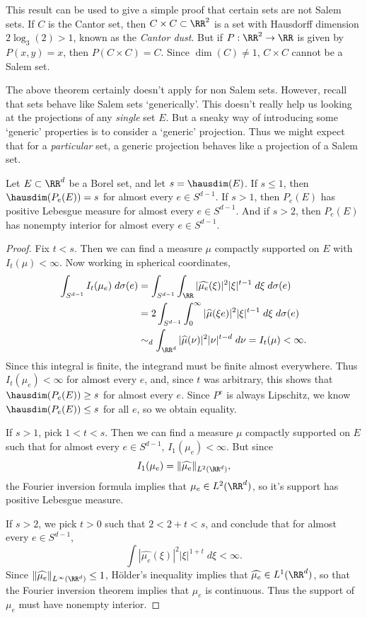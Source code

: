 \begin{remark}
	This result can be used to give a simple proof that certain sets are not Salem sets. If $C$ is the Cantor set, then $C \times C \subset \RR^2$ is a set with Hausdorff dimension $2 \log_3(2) > 1$, known as the \emph{Cantor dust}. But if $P: \RR^2 \to \RR$ is given by $P(x,y) = x$, then $P(C \times C) = C$. Since $\dim(C) \neq 1$, $C \times C$ cannot be a Salem set.
\end{remark}

The above theorem certainly doesn't apply for non Salem sets. However, recall that sets behave like Salem sets `generically'. This doesn't really help us looking at the projections of any \emph{single} set $E$. But a sneaky way of introducing some `generic' properties is to consider a `generic' projection. Thus we might expect that for a \emph{particular} set, a generic projection behaves like a projection of a Salem set.

\begin{theorem}
	Let $E \subset \RR^d$ be a Borel set, and let $s = \hausdim(E)$. If $s \leq 1$, then $\hausdim(P_e(E)) = s$ for almost every $e \in S^{d-1}$. If $s > 1$, then $P_e(E)$ has positive Lebesgue measure for almost every $e \in S^{d-1}$. And if $s > 2$, then $P_e(E)$ has nonempty interior for almost every $e \in S^{d-1}$.
\end{theorem}
\begin{proof}
	Fix $t < s$. Then we can find a measure $\mu$ compactly supported on $E$ with $I_t(\mu) < \infty$. Now working in spherical coordinates,
	\begin{align*}
		\int_{S^{d-1}} I_t(\mu_e)\; d\sigma(e) &= \int_{S^{d-1}} \int_{\RR} |\widehat{\mu_e}(\xi)|^2 |\xi|^{t-1}\; d\xi\; d\sigma(e)\\
		&= 2 \int_{S^{d-1}} \int_0^\infty |\widehat{\mu}(\xi e)|^2 |\xi|^{t-1}\; d\xi\; d\sigma(e)\\
		&\sim_d \int_{\RR^d} |\widehat{\mu}(\nu)|^2 |\nu|^{t-d}\; d\nu = I_t(\mu) < \infty.
	\end{align*}
	Since this integral is finite, the integrand must be finite almost everywhere. Thus $I_t(\mu_e) < \infty$ for almost every $e$, and, since $t$ was arbitrary, this shows that $\hausdim(P_e(E)) \geq s$ for almost every $e$. Since $P^e$ is always Lipschitz, we know $\hausdim(P_e(E)) \leq s$ for all $e$, so we obtain equality.

	If $s > 1$, pick $1 < t < s$. Then we can find a measure $\mu$ compactly supported on $E$ such that for almost every $e \in S^{d-1}$, $I_1(\mu_e) < \infty$. But since
	\[ I_1(\mu_e) = \| \widehat{\mu_e} \|_{L^2(\RR^d)}, \]
	the Fourier inversion formula implies that $\mu_e \in L^2(\RR^d)$, so it's support has positive Lebesgue measure.

	If $s > 2$, we pick $t > 0$ such that $2 < 2 + t < s$, and conclude that for almost every $e \in S^{d-1}$,
	\[ \int |\widehat{\mu_e}(\xi)|^2 |\xi|^{1 + t}\; d\xi < \infty. \]
	Since $\| \widehat{\mu_e} \|_{L^\infty(\RR^d)} \leq 1$, H\"{o}lder's inequality implies that $\widehat{\mu_e} \in L^1(\RR^d)$, so that the Fourier inversion theorem implies that $\mu_e$ is continuous. Thus the support of $\mu_e$ must have nonempty interior.
\end{proof}

